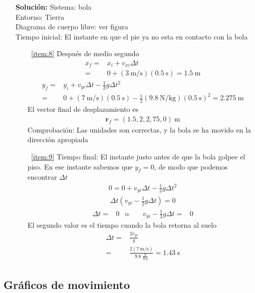 \begin{itemize}
\item[\textbf{Solución:}] Sistema: bola\\
Entorno: Tierra\\
Diagrama de cuerpo libre: ver figura\\
Tiempo inicial: El instante en que el pie ya no esta en contacto con la bola
\begin{itemize}
\item[~\ref{item:8}]
Después de medio segundo
\begin{align}
  x_f=&x_i+v_{xi}\Delta t\nonumber\\
  =&0+(3\ \text{m/s})(0.5\ \text{s})=1.5\ \text{m}
\end{align}
\begin{align}
  y_f=&y_i+v_{yi}\Delta t-\frac{1}{2}g \Delta t^2\nonumber\\
=& 0+(7\ \text{m/s})(0.5\ \text{s})-\frac{1}{2}(9.8\ \text{N/kg})(0.5\ \text{s})^2=2.275\ \text{m}
\end{align}
El vector final de desplazamiento es
\begin{align}
  \mathbf{r}_f=(1.5,2,2,75,0)\ \text{m}
\end{align}
Comprobación: Las unidades son correctas, y la bola se ha movido en la dirección apropiada
\item[~\ref{item:9}] Tiempo final: El instante justo antes de que la bola golpee el piso. En ese instante sabemos que $y_f=0$, de modo que podemos encontrar $\Delta t$
  \begin{align}
    0=0+v_{yi}\Delta t-\frac{1}{2}g\Delta t^2
  \end{align}
  \begin{align}
 \Delta t(v_{yi}-\frac{1}{2}g\Delta t)=0   
  \end{align}
  \begin{align}
    \Delta t=&0 &\text{o}\qquad v_{yi}-\frac{1}{2}g\Delta t=&0
  \end{align}
El segundo valor es el tiempo cuando la bola retorna al suelo
\begin{align}
  \Delta t=&\frac{2 v_{yi}}{g}\nonumber\\
=&\frac{2(7\ \text{m/s})}{9.8\ \frac{N}{Kg}}=1.43\ \text{s}
\end{align}
\end{itemize}

\end{itemize}

\subsection{Gráficos de movimiento}

